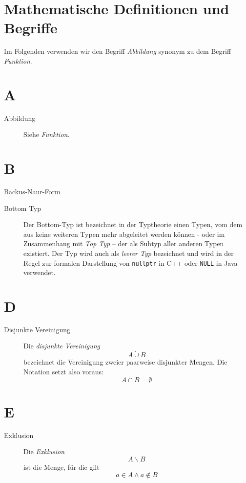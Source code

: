 \section{Mathematische Definitionen und Begriffe}

Im Folgenden verwenden wir den Begriff \textit{Abbildung} synonym zu dem Begriff \textit{Funktion}.

\section*{A}

\begin{description}
    \item[Abbildung]
    Siehe \textit{Funktion}.
\end{description}

\section*{B}

\begin{description}
    \item[Backus-Naur-Form]
\end{description}
\begin{description}
    \item[Bottom Typ \bot]
    Der Bottom-Typ ist bezeichnet in der Typtheorie einen Typen, vom dem aus keine weiteren Typen mehr abgeleitet werden können - oder im Zusammenhang mit \textit{Top Typ} -- der als Subtyp aller anderen Typen existiert.
    Der Typ wird auch als \textit{leerer Typ} bezeichnet und wird in der Regel zur formalen Darstellung von \texttt{nullptr} in C++ oder \texttt{NULL} in Java verwendet.
\end{description}

\section*{D}

\begin{description}
    \item[Disjunkte Vereinigung]
    Die \textit{disjunkte Vereinigung}
    \[
        A \dot\cup B
    \]
    \noindent
    bezeichnet die Vereinigung zweier paarweise disjunkter Mengen.
    Die Notation setzt also voraus:
    \[
        A \cap B = \emptyset
    \]
\end{description}

\section*{E}
\begin{description}
    \item[Exklusion]
    Die \textit{Exklusion}
    \[
        A \backslash B
    \]
    \noindent
    ist die Menge, für die gilt
    \[
        a \in A \land a \notin B
    \]
\end{description}

